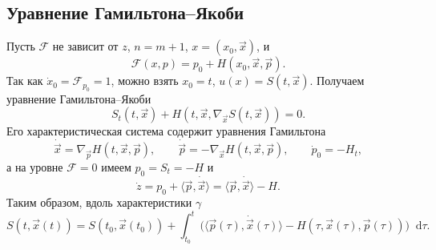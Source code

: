 \documentclass[11pt,a4paper]{report}
\numberwithin{equation}{section}
\numberwithin{figure}{chapter}
\numberwithin{table}{chapter}
\newcommand{\dd}{\mathop{}\!\mathrm{d}}
\begin{document}
\subsection{Уравнение Гамильтона--Якоби}
Пусть $\mathcal F$ не зависит от $z$, $n=m+1$, $x=(x_0,\vec x)$, и
\[
\mathcal F(x,p)=p_0+H(x_0,\vec x,\vec p).
\]
Так как $\dot x_0=\mathcal F_{p_0}=1$, можно взять $x_0=t$, $u(x)=S(t,\vec x)$.
Получаем уравнение Гамильтона--Якоби
\[
\boxed{S_t(t,\vec x)+H(t,\vec x,\nabla_{\vec x}S(t,\vec x))=0.}
\]
Его характеристическая система содержит уравнения Гамильтона
\[
\dot{\vec x}=\nabla_{\vec p}H(t,\vec x,\vec p),\qquad
\dot{\vec p}=-\nabla_{\vec x}H(t,\vec x,\vec p),\qquad
\dot p_0=-H_t,
\]
а на уровне $\mathcal F=0$ имеем $p_0=S_t=-H$ и
\[
\dot z=p_0+\langle\vec p,\dot{\vec x}\rangle
 =\langle\vec p,\dot{\vec x}\rangle-H.
\]
Таким образом, вдоль характеристики $\gamma$
\[
S(t,\vec x(t))=S(t_0,\vec x(t_0))+
\int_{t_0}^t\bigl(\langle\vec p(\tau),\dot{\vec x}(\tau)\rangle
 -H(\tau,\vec x(\tau),\vec p(\tau))\bigr)\dd\tau.
\]
\end{document}

